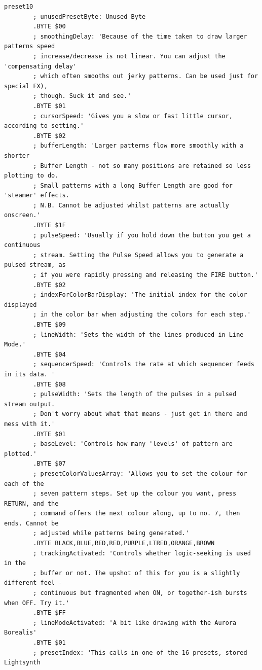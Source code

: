 \begin{lstlisting}[basicstyle=\tiny,caption=Source code for Preset 10.]
preset10
        ; unusedPresetByte: Unused Byte
        .BYTE $00
        ; smoothingDelay: 'Because of the time taken to draw larger patterns speed
        ; increase/decrease is not linear. You can adjust the 'compensating delay'
        ; which often smooths out jerky patterns. Can be used just for special FX),
        ; though. Suck it and see.'
        .BYTE $01
        ; cursorSpeed: 'Gives you a slow or fast little cursor, according to setting.'
        .BYTE $02
        ; bufferLength: 'Larger patterns flow more smoothly with a shorter
        ; Buffer Length - not so many positions are retained so less plotting to do.
        ; Small patterns with a long Buffer Length are good for 'steamer' effects.
        ; N.B. Cannot be adjusted whilst patterns are actually onscreen.'
        .BYTE $1F
        ; pulseSpeed: 'Usually if you hold down the button you get a continuous
        ; stream. Setting the Pulse Speed allows you to generate a pulsed stream, as
        ; if you were rapidly pressing and releasing the FIRE button.'
        .BYTE $02
        ; indexForColorBarDisplay: 'The initial index for the color displayed
        ; in the color bar when adjusting the colors for each step.'
        .BYTE $09
        ; lineWidth: 'Sets the width of the lines produced in Line Mode.'
        .BYTE $04
        ; sequencerSpeed: 'Controls the rate at which sequencer feeds in its data. '
        .BYTE $08
        ; pulseWidth: 'Sets the length of the pulses in a pulsed stream output.
        ; Don't worry about what that means - just get in there and mess with it.'
        .BYTE $01
        ; baseLevel: 'Controls how many 'levels' of pattern are plotted.'
        .BYTE $07
        ; presetColorValuesArray: 'Allows you to set the colour for each of the
        ; seven pattern steps. Set up the colour you want, press RETURN, and the
        ; command offers the next colour along, up to no. 7, then ends. Cannot be
        ; adjusted while patterns being generated.'
        .BYTE BLACK,BLUE,RED,RED,PURPLE,LTRED,ORANGE,BROWN
        ; trackingActivated: 'Controls whether logic-seeking is used in the
        ; buffer or not. The upshot of this for you is a slightly different feel -
        ; continuous but fragmented when ON, or together-ish bursts when OFF. Try it.'
        .BYTE $FF
        ; lineModeActivated: 'A bit like drawing with the Aurora Borealis'
        .BYTE $01
        ; presetIndex: 'This calls in one of the 16 presets, stored Lightsynth

\end{lstlisting}
